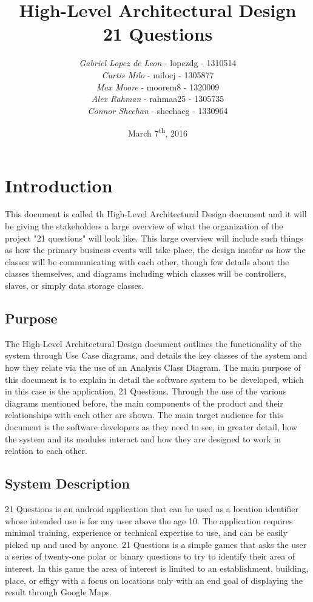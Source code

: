 \documentclass[titlepage]{article}
\title{\Huge{\textbf{High-Level Architectural Design\\21 Questions}}\vspace{9cm}}
\author{\textit{Gabriel Lopez de Leon} - lopezdg - 1310514\\\textit{Curtis Milo} - milocj - 1305877\\\textit{Max Moore} - moorem8 - 1320009\\\textit{Alex Rahman} - rahmaa25 - 1305735\\\textit{Connor Sheehan} - sheehacg - 1330964}
\date{March 7\textsuperscript{th}, 2016}
\begin{document}
\maketitle	

\tableofcontents
\newpage

\section{Introduction}
\label{sec:introduction}

This document is called th High-Level Architectural Design document and it will be giving the stakeholders a large overview of what the organization of the project "21 questions" will look like.  This large overview will include such things as how  the primary business events will take place, the design insofar as how the classes will be communicating with each other, though few details about the classes themselves, and diagrams including which classes will be controllers, slaves, or simply data storage classes.

\subsection{Purpose}
\label{sub:purpose}
The High-Level Architectural Design document outlines the functionality of the system through Use Case diagrams, and details the key classes of the system and how they relate via the use of an Analysis Class Diagram. The main purpose of this document is to explain in detail the software system to be developed, which in this case is the application, 21 Questions. Through the use of the various diagrams mentioned before, the main components of the product and their relationships with each other are shown. The main target audience for this document is the software developers as they need to see, in greater detail, how the system and its modules interact and how they are designed to work in relation to each other.

\subsection{System Description}
\label{sub:system_description}
21 Questions is an android application that can be used as a location identifier whose intended use is for any user above the age 10. The application requires minimal training, experience or technical expertise to use, and can be easily picked up and used by anyone. 21 Questions is a simple games that asks the user a series of twenty-one polar or binary questions to try to identify their area of interest. In this game the area of interest is limited to an establishment, building, place, or effigy with a focus on locations only with an end goal of displaying the result through Google Maps.
\end{document}
